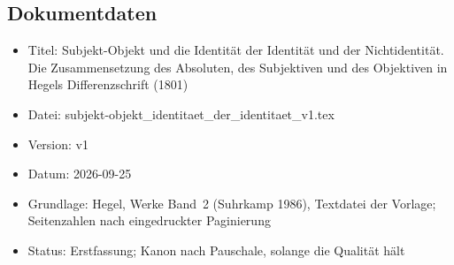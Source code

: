 \documentclass[11pt,a4paper]{article}
\begin{document}
\subsection*{Dokumentdaten}
\begin{itemize}
\item Titel: Subjekt-Objekt und die Identität der Identität und der Nichtidentität. Die Zusammensetzung des Absoluten, des Subjektiven und des Objektiven in Hegels Differenzschrift (1801)
\item Datei: subjekt-objekt\_identitaet\_der\_identitaet\_v1.tex
\item Version: v1
\item Datum: 2026-09-25
\item Grundlage: Hegel, Werke Band~2 (Suhrkamp 1986), Textdatei der Vorlage; Seitenzahlen nach eingedruckter Paginierung
\item Status: Erstfassung; Kanon nach Pauschale, solange die Qualität hält
\end{itemize}
\end{document}
